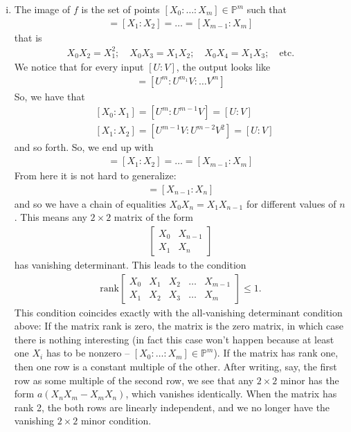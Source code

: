 \documentclass[12pt]{article}
\begin{document}
\begin{enumerate}[(i)]
	
	\item The image of $f$ is the set of points $[X_0:\dots : X_m] \in \mathbb{P}^m$ such that 
	\begin{align*}
	[X_0 : X_1] = [X_1 : X_2] = \dots = [X_{m-1} : X_m]
	\end{align*} 
	that is 
	\begin{align*}
	X_0 X_2 = X_1^2;\quad X_0X_3 = X_1 X_2; \quad X_0 X_4 = X_1X_3; \quad \mbox{etc}.
	\end{align*}
	We notice that for every input $[U:V]$, the output looks like
	\begin{align*}
	[X_0 : X_1 : \dots : X_m] = [U^m : U^{m_1}V : \dots V^m]
	\end{align*}
	So, we have that 
	\begin{align*}
	&[X_0 : X_1] = [U^m : U^{m-1}V] = [U:V]\\
	&[X_1 : X_2] = [U^{m-1}V : U^{m-2}V^2] = [U:V]
	\end{align*}
	and so forth. So, we end up with 
	\begin{align*}
	[X_0 : X_1] = [X_1 : X_2] = \dots = [X_{m-1} : X_m]
	\end{align*}
	From here it is not hard to generalize:
	\begin{align*}
	[X_0 : X_1] = [X_{n-1} : X_n]
	\end{align*}
	and so we have a chain of equalities $X_0 X_n = X_1 X_{n-1}$ for different values of $n$. This means any $2\times 2$ matrix of the form
	\begin{align*}
	\begin{bmatrix}
	X_0 & X_{n-1}\\ X_1 & X_n
	\end{bmatrix}
	\end{align*}
	has vanishing determinant. This leads to the condition
	\begin{align*}
	\mbox{rank}\begin{bmatrix}
	X_0 & X_1 & X_2 & \dots & X_{m-1}\\
	X_1 & X_2 & X_3 & \dots & X_{m}
	\end{bmatrix} \leq 1.
	\end{align*}
	This condition coincides exactly with the all-vanishing determinant condition above: If the matrix rank is zero, the matrix is the zero matrix, in which case there is nothing interesting (in fact this case won't happen because at least one $X_i$ has to be nonzero -- $[X_0 : \dots : X_m] \in \mathbb{P}^m$). If the matrix has rank one, then one row is a constant multiple of the other. After writing, say, the first row as some multiple of the second row, we see that any $2\times 2$ minor has the form $a(X_n X_m - X_m X_n)$, which vanishes identically. When the matrix has rank 2, the both rows are linearly independent, and we no longer have the vanishing $2\times 2$ minor condition.
	

\end{enumerate}
\end{document}
